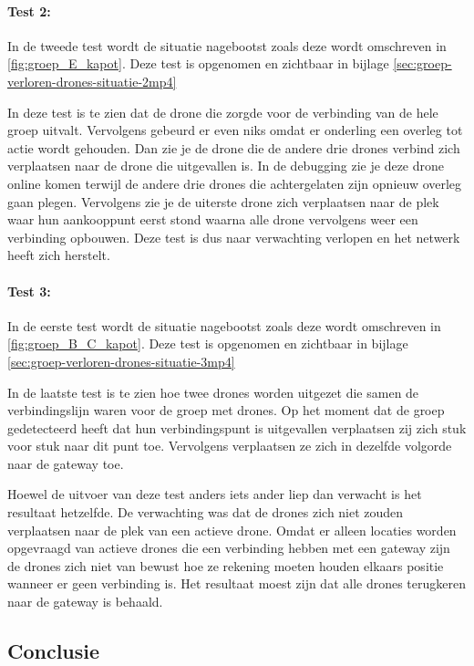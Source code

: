 \documentclass[a4paper, 11pt, oneside]{report}
\begin{document}
\paragraph{Test 2:} In de tweede test wordt de situatie nagebootst zoals deze wordt omschreven in \autoref{fig:groep_E_kapot}.
Deze test is opgenomen en zichtbaar in bijlage \ref{sec:groep-verloren-drones-situatie-2mp4}

In deze test is te zien dat de drone die zorgde voor de verbinding van de hele groep uitvalt. Vervolgens gebeurd er even niks omdat er onderling een overleg tot actie wordt gehouden. Dan zie je de drone die de andere drie drones verbind zich verplaatsen naar de drone die uitgevallen is.
In de debugging zie je deze drone online komen terwijl de andere drie drones die achtergelaten zijn opnieuw overleg gaan plegen. 
Vervolgens zie je de uiterste drone zich verplaatsen naar de plek waar hun aankooppunt eerst stond waarna alle drone vervolgens weer een verbinding opbouwen. Deze test is dus naar verwachting verlopen en het netwerk heeft zich herstelt.

\paragraph{Test 3:} In de eerste test wordt de situatie nagebootst zoals deze wordt omschreven in \autoref{fig:groep_B_C_kapot}.
Deze test is opgenomen en zichtbaar in bijlage \ref{sec:groep-verloren-drones-situatie-3mp4}

In de laatste test is te zien hoe twee drones worden uitgezet die samen de verbindingslijn waren voor de groep met drones.
Op het moment dat de groep gedetecteerd heeft dat hun verbindingspunt is uitgevallen verplaatsen zij zich stuk voor stuk naar dit punt toe.
Vervolgens verplaatsen ze zich in dezelfde volgorde naar de gateway toe.

Hoewel de uitvoer van deze test anders iets ander liep dan verwacht is het resultaat hetzelfde.
De verwachting was dat de drones zich niet zouden verplaatsen naar de plek van een actieve drone.
Omdat er alleen locaties worden opgevraagd van actieve drones die een verbinding hebben met een gateway zijn de drones zich niet van bewust hoe ze rekening moeten houden elkaars positie wanneer er geen verbinding is.
Het resultaat moest zijn dat alle drones terugkeren naar de gateway is behaald.

\subsection{Conclusie}
\end{document}
